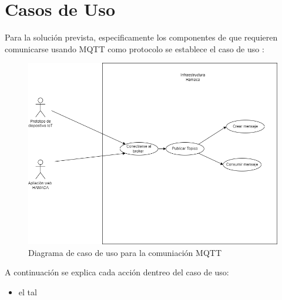 

\chapter{Casos de Uso}
Para la solución prevista, especificamente los componentes de que requieren comunicarse usando MQTT como protocolo se establece el caso de uso :

\begin{figure}[htb]
\centering
\includegraphics[scale=0.35]{./Figuras/caso_de_uso_mqtt.png}
\caption{Diagrama de caso de uso para la comuniación MQTT}
\label{fig:caso_de_uso_mqtt}
\vspace*{-10pt}
\end{figure}

A continuación se explica cada acción dentreo del caso de uso:
\begin{itemize}
\item el tal
\end{itemize}

